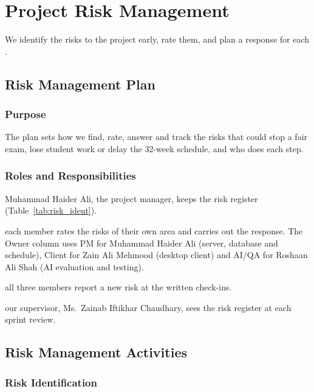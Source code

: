 \section{Project Risk Management}

We identify the risks to the project early, rate them, and plan a response for each \cite{risk1}.

\subsection{Risk Management Plan}

\subsubsection{Purpose}

The plan sets how we find, rate, answer and track the risks that could stop a fair exam, lose student work or delay the 32-week schedule, and who does each step.

\subsubsection{Roles and Responsibilities}

\begin{description}[nosep]
    \item[Risk manager:] Muhammad Haider Ali, the project manager, keeps the risk register (Table~\ref{tab:risk_ident}).
    \item[Risk owners:] each member rates the risks of their own area and carries out the response. The Owner column uses PM for Muhammad Haider Ali (server, database and schedule), Client for Zain Ali Mehmood (desktop client) and AI/QA for Roshaan Ali Shah (AI evaluation and testing).
    \item[Team members:] all three members report a new risk at the written check-ins.
    \item[Stakeholder:] our supervisor, Ms.~Zainab Iftikhar Chaudhary, sees the risk register at each sprint review.
\end{description}

\subsection{Risk Management Activities}

\subsubsection{Risk Identification}

